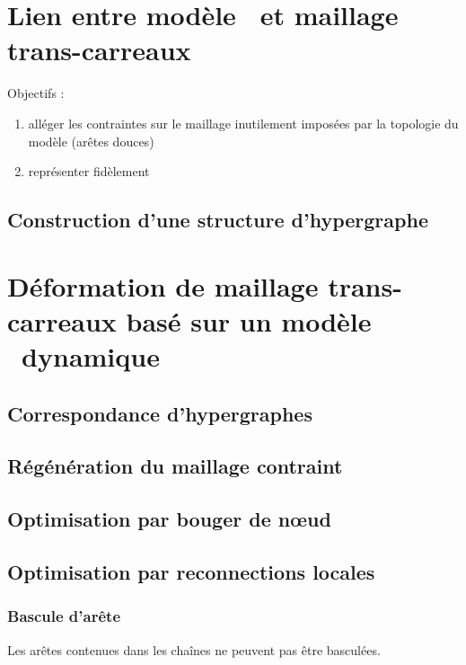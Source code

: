 \section{Lien entre modèle \brep\ et maillage trans-carreaux}
Objectifs :
\begin{enumerate}
	\item alléger les contraintes sur le maillage inutilement imposées par la topologie du modèle \brep (arêtes douces)
	\item représenter fidèlement 
\end{enumerate}

\subsection{Construction d'une structure d'hypergraphe}


\section{Déformation de maillage trans-carreaux basé sur un modèle \brep\ dynamique}
\subsection{Correspondance d'hypergraphes}

\subsection{Régénération du maillage contraint}

\subsection{}

\subsection{Optimisation par bouger de n\oe ud}
\label{section:projection_surface_composite}

\subsection{Optimisation par reconnections locales}
\subsubsection{Bascule d'arête}
Les arêtes contenues dans les chaînes ne peuvent pas être basculées.

